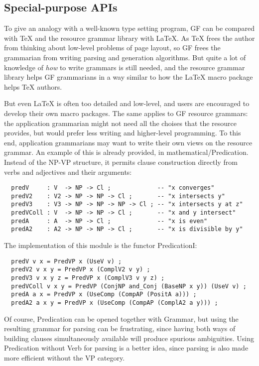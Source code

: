 \documentclass[11pt,a4paper]{article}
\begin{document}
\subsection{Special-purpose APIs}
To give an analogy with a well-known type setting program, GF can be compared
with TeX and the resource grammar library with LaTeX. As TeX frees the author
from thinking about low-level problems of page layout, so GF frees the grammarian
from writing parsing and generation algorithms. But quite a lot of knowledge of
\textit{how} to write grammars is still needed, and the resource grammar library helps
GF grammarians in a way similar to how the LaTeX macro package helps TeX authors.

But even LaTeX is often too detailed and low-level, and users are encouraged to
develop their own macro packages. The same applies to GF resource grammars:
the application grammarian might not need all the choises that the resource
provides, but would prefer less writing and higher-level programming.
To this end, application grammarians may want to write their own views on the
resource grammar. An example of this is already provided, in mathematical/Predication.
Instead of the NP-VP structure, it permits clause construction directly from
verbs and adjectives and their arguments:

\begin{verbatim}
  predV     : V  -> NP -> Cl ;             -- "x converges"
  predV2    : V2 -> NP -> NP -> Cl ;       -- "x intersects y"
  predV3    : V3 -> NP -> NP -> NP -> Cl ; -- "x intersects y at z"
  predVColl : V  -> NP -> NP -> Cl ;       -- "x and y intersect"
  predA     : A  -> NP -> Cl ;             -- "x is even"
  predA2    : A2 -> NP -> NP -> Cl ;       -- "x is divisible by y"
\end{verbatim}
The implementation of this module is the functor PredicationI:

\begin{verbatim}
  predV v x = PredVP x (UseV v) ;
  predV2 v x y = PredVP x (ComplV2 v y) ;
  predV3 v x y z = PredVP x (ComplV3 v y z) ;
  predVColl v x y = PredVP (ConjNP and_Conj (BaseNP x y)) (UseV v) ;
  predA a x = PredVP x (UseComp (CompAP (PositA a))) ;
  predA2 a x y = PredVP x (UseComp (CompAP (ComplA2 a y))) ;
\end{verbatim}
Of course, Predication can be opened together with Grammar, but using
the resulting grammar for parsing can be frustrating, since having both
ways of building clauses simultaneously available will produce spurious
ambiguities. Using Predication without Verb for parsing is a better idea,
since parsing is also made more efficient without the VP category.
\end{document}
